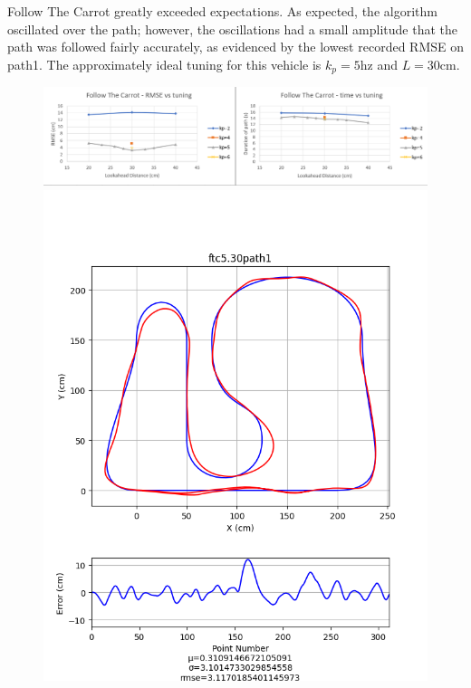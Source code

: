 \documentclass[mla8alt]{mla}
\begin{document}
\begin{paper}
Follow The Carrot greatly exceeded expectations. As expected, the algorithm oscillated over the path; however, the oscillations had a small amplitude that the path was followed fairly accurately, as evidenced by the lowest recorded RMSE on path1. The approximately ideal tuning for this vehicle is $k_p=5$hz and $L=30$cm.
\begin{figure}[H]
\includegraphics[width=\linewidth]{tuningGraphs/ftc}
\includegraphics[width=\linewidth]{pathData/ftcpath1}
\endminipage\hfill
{}

\end{figure}
\end{paper}
\end{document}
